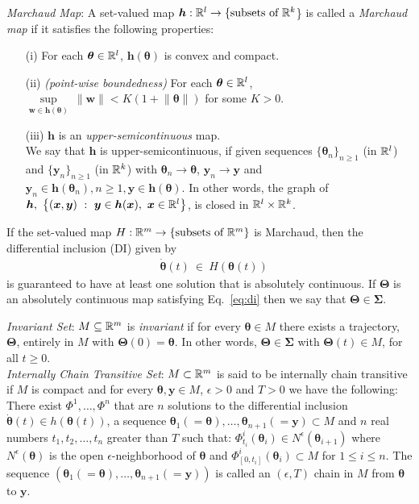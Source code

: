 \documentclass{article}
\newcommand\Bh{\bm{h}}
\newcommand\Bw{\bm{w}}
\newcommand\Bx{\bm{x}}
\newcommand\By{\bm{y}}
\newcommand\Bth{\bm{\theta}}
\newcommand\BSi{\bm{\Sigma}}
\newcommand\BTh{\bm{\Theta}}
\begin{document}
\textit{Marchaud Map}: A set-valued map $\Bh: \dR^l \to \{\text{subsets of}\ \dR^k$\}
is called a \textit{Marchaud map} if it satisfies
the following properties:
\begin{itemize}
 \item[(i)] For each $\Bth \in \dR^l$, $\Bh(\Bth)$ is convex and compact.
 \item[(ii)] \textit{(point-wise boundedness)} For each $\Bth \in \dR^l$,
 $\underset{\Bw \in \Bh(\Bth)}{\sup} \
\lVert \Bw \rVert < K \left( 1 + \lVert \Bth \rVert \right)$
for some $K > 0$.
 \item[(iii)] $\Bh$ is an \textit{upper-semicontinuous} map. \\ \indent
 We say that $\Bh$ is upper-semicontinuous,
  if given sequences $\{ \Bth_{n} \}_{n \ge 1}$ (in $\mathbb{R}^l$) and
  $\{ \By_{n} \}_{n \ge 1}$ (in $\mathbb{R}^k$)  with
  $\Bth_{n} \to \Bth$, $\By_{n} \to \By$ and
  $\By_{n} \in \Bh(\Bth_{n}), n \ge 1, \By \in \Bh(\Bth)$.
   In other words, the graph of
   $\Bh, \ \left\{ (\Bx, \By) \ : \ \By \in \Bh(\Bx),\ \Bx\in \dR^l \right\}$,
  is closed in $\mathbb{R}^l \times \mathbb{R}^k$.
\end{itemize}

If the set-valued map $H: \mathbb{R}^m \to \{\text{subsets of}\ \mathbb{R}^m \}$
is  Marchaud, then
the differential inclusion (DI) given by
\begin{align}
\label{eq:di}
&\dot{\Bth}(t) \ \in \ H(\Bth(t))
\end{align}
is guaranteed to have at least one solution that is absolutely continuous.
If $\BTh$ is an absolutely continuous map satisfying  Eq.~\eqref{eq:di} then we say that $\BTh \in \BSi$.

\textit{Invariant Set}:
$M \subseteq \mathbb{R}^m$ is \textit{invariant} if for every $\Bth \in M$ there exists
a trajectory, $\BTh$, entirely in $M$
with $\BTh(0) = \Bth$.
In other words, $\BTh \in \BSi$ with $\BTh(t) \in M$,
for all $t \ge 0$.
\\ \indent
\textit{Internally Chain Transitive Set}:
$M \subset \mathbb{R}^m$ is said to be
internally chain transitive if $M$ is compact and for every $\Bth, \By \in M$,
$\epsilon >0$ and $T > 0$ we have the following: There exist $\Phi^{1}, \ldots, \Phi^{n}$ that
are $n$ solutions to the differential inclusion $\dot{\Bth}(t) \in h(\Bth(t))$,
a sequence $\Bth_1(=\Bth), \ldots, \Bth_{n+1} (=\By) \subset M$
and $n$ real numbers
$t_{1}, t_{2}, \ldots, t_{n}$ greater than $T$ such that:
$\Phi^i_{t_{i}}(\Bth_i) \in N^\epsilon(\Bth_{i+1})$
where $N^\epsilon(\Bth)$ is the open $\epsilon$-neighborhood of $\Bth$ and
$\Phi^{i}_{[0, t_{i}]}(\Bth_i) \subset M$
for $1 \le i \le n$. The sequence $(\Bth_{1}(=\Bth), \ldots, \Bth_{n+1}(=\By))$
is called an $(\epsilon, T)$ chain in $M$ from $\Bth$ to $\By$.
\end{document}
